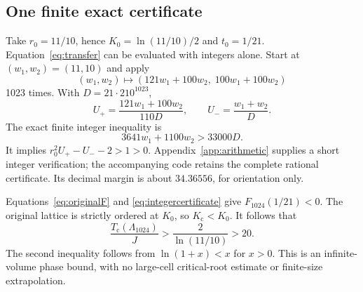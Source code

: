 \documentclass[aps,pre,reprint,amsmath,amssymb,nofootinbib,longbibliography,floatfix]{revtex4-2}
\newcommand{\Tc}{T_{\mathrm c}}
\begin{document}
\subsection{One finite exact certificate}
Take \(r_0=11/10\), hence \(K_0=\ln(11/10)/2\) and \(t_0=1/21\). Equation~\eqref{eq:transfer} can be evaluated with integers alone. Start at \((w_1,w_2)=(11,10)\) and apply
\begin{equation}
 (w_1,w_2)\longmapsto
 (121w_1+100w_2,\;100w_1+100w_2)
 \label{eq:integer}
\end{equation}
1023 times. With \(D=21\cdot210^{1023}\),
\begin{equation}
 U_+=\frac{121w_1+100w_2}{110D},\qquad
 U_-=\frac{w_1+w_2}{D}.
\end{equation}
The exact finite integer inequality is
\begin{equation}
 3641w_1+1100w_2>33000D.
 \label{eq:integercertificate}
\end{equation}
It implies \(r_0^2U_+-U_--2>1>0\). Appendix~\ref{app:arithmetic} supplies a short integer verification; the accompanying code retains the complete rational certificate. Its decimal margin is about \(34.36556\), for orientation only.

Equations~\eqref{eq:originalF} and \eqref{eq:integercertificate} give \(F_{1024}(1/21)<0\). The original lattice is strictly ordered at \(K_0\), so \(K_{\mathrm c}<K_0\). It follows that
\begin{equation}
 \boxed{\frac{\Tc(\Lambda_{1024})}{J}>
       \frac2{\ln(11/10)}>20.}
 \label{eq:lower}
\end{equation}
The second inequality follows from \(\ln(1+x)<x\) for \(x>0\). This is an infinite-volume phase bound, with no large-cell critical-root estimate or finite-size extrapolation.
\end{document}
